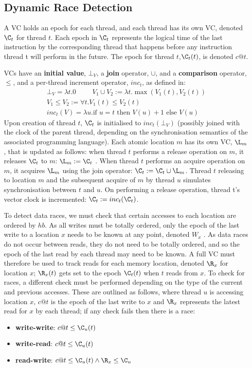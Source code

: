 \documentclass[11pt]{article}
\begin{document}
\subsection{Dynamic Race Detection}
\label{sec:orgdaf8aac}
\label{2.2}
A VC holds an epoch for each thread, and each thread has its own VC, denoted \(\C_t\) for thread
\(t\). Each epoch in \(\C_t\) represents the logical time of the last instruction by the corresponding
thread that happens before any instruction thread t will perform in the future. The epoch for thread
\(t\),\(\C_t(t)\), is denoted \(c@t\).

VCs have an \textbf{initial value}, \(\bot_V\), a \textbf{join} operator, \(\cup\), and a \textbf{comparison} operator, \(\le\),
and a per-thread increment operator, \(inc_t\), as defined in:
\begin{gather*}
\bot_V=\lambda t.0\hspace{1cm}V_1\cup V_2:=\lambda t.\max(V_1(t), V_2(t))\\
V_1\le V_2:=\forall t.V_1(t)\le V_2(t)\\
inc_t(V)=\lambda u.\text{if }u=t\text{ then }V(u)+1\text{ else }V(u)
\end{gather*}
Upon creation of thread \(t\), \(\C_t\) is initialised to \(inc_t(\bot_V)\) (possibly joined with the
clock of the parent thread, depending on the synchronisation semantics of the associated programming
language).  Each atomic location \(m\) has its own VC, \(\L_m\), that is updated as follows: when
thread \(t\) performs a release operation on \(m\), it releases \(\C_t\) to \(m\): \(\L_m:=\C_t\) .
When thread \(t\) performs an acquire operation on \(m\), it acquires \(\L_m\) using the join
operator: \(\C_t:=\C_t\cup\L_m\). Thread \(t\) releasing to location \(m\) and the subsequent acquire
of \(m\) by thread \(u\) simulates synchronisation between \(t\) and \(u\). On performing a release
operation, thread t’s vector clock is incremented: \(\C_t:=inc_t(\C_t)\).

To detect data races, we must check that certain accesses to each location are ordered by \(hb\). As
all writes must be totally ordered, only the epoch of the last write to a location \(x\) needs to be
known at any point, denoted \(W_x\) . As data races do not occur between reads, they do not need to be
totally ordered, and so the epoch of the last read by each thread may need to be known. A full VC must
therefore be used to track reads for each memory location, denoted \(\R_x\) for location \(x\);
\(\R_x(t)\) gets set to the epoch \(\C_t(t)\) when \(t\) reads from \(x\). To check for races, a
different check must be performed depending on the type of the current and previous accesses. These
are outlined as follows, where thread \(u\) is accessing location \(x\), \(c@t\) is the epoch of the
last write to \(x\) and \(\R_x\) represents the latest read for \(x\) by each thread; if any check
fails then there is a race:
\begin{itemize}
\item \textbf{write-write}: \(c@t\le\C_u(t)\)
\item \textbf{write-read}: \(c@t\le\C_u(t)\)
\item \textbf{read-write}: \(c@t\le\C_u(t)\wedge\R_x\le\C_u\)
\end{itemize}
\end{document}
